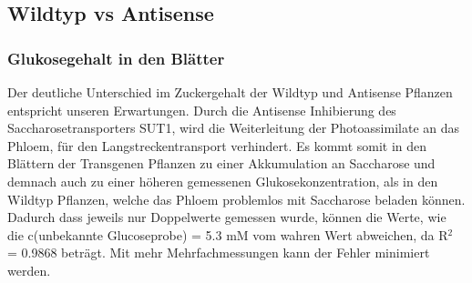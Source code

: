 \documentclass[10pt,a4paper]{article}
\begin{document}
	
	\subsection{Wildtyp vs Antisense}
	\subsubsection{Glukosegehalt in den Blätter}
	Der deutliche Unterschied im Zuckergehalt der Wildtyp und Antisense Pflanzen entspricht unseren Erwartungen. Durch die Antisense Inhibierung des Saccharosetransporters SUT1, wird die Weiterleitung der Photoassimilate an das Phloem, für den Langstreckentransport verhindert. Es kommt somit in den Blättern der Transgenen Pflanzen zu einer Akkumulation an Saccharose und demnach auch zu einer höheren gemessenen Glukosekonzentration, als in den Wildtyp Pflanzen, welche das Phloem problemlos mit Saccharose beladen können. \\
	Dadurch dass jeweils nur Doppelwerte gemessen wurde, können die Werte, wie die c(unbekannte Glucoseprobe) = 5.3 mM vom wahren Wert abweichen, da R$^2$ = 0.9868 beträgt.
	Mit mehr Mehrfachmessungen kann der Fehler minimiert werden.
\end{document}
